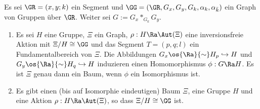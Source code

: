 \SATZ \label{satz_segment}
Es sei $\GR=(x,y;k)$ ein Segment und
$\GG=(\GR,G_x,G_y,G_k,\alpha_k,\alpha_{\bar{k}})$
ein Graph von Gruppen über $\GR$.
Weiter sei $G:=G_x *_{G_k} G_y$.
\begin{enumerate}
\item Es sei $H$ eine Gruppe, $\Xi$ ein Graph,
$\rho:H\Ra\Aut(\Xi)$ eine inversionsfreie Aktion
mit $\Xi/H\cong\GG$ und das Segment $T=(p,q;l)$ ein
Fundamentalbereich von $\Xi$.
Die Abbildungen
$G_x \os{\Ra}{\sim} H_p \hookrightarrow H$ und
$G_y \os{\Ra}{\sim} H_q \hookrightarrow H$
induzieren einen Homomorphismus
$\phi:G \Ra H$. Es ist $\Xi$ genau dann ein Baum, wenn
$\phi$ ein Isomorphismus ist.
\item Es gibt einen (bis auf Isomorphie eindeutigen) Baum $\Xi$,
eine Gruppe $H$ und eine Aktion $\rho:H\Ra\Aut(\Xi)$, so dass
$\Xi/H\cong\GG$ ist.
\end{enumerate}
